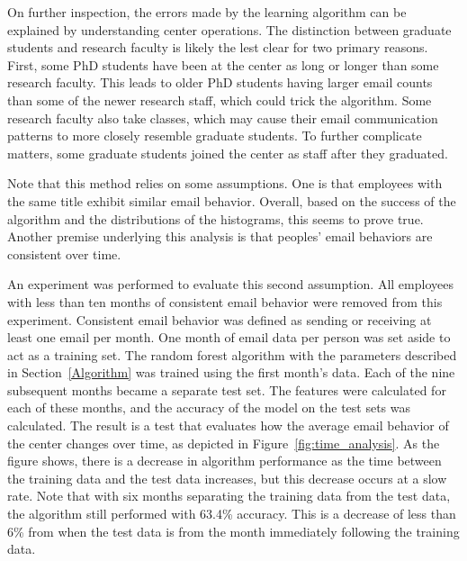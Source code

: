 \documentclass[12pt]{report}
\begin{document}
On further inspection, the errors made by the learning algorithm can be explained by understanding center operations.
The distinction between graduate students and research faculty is likely the lest clear for two primary reasons.
First, some PhD students have been at the center as long or longer than some research faculty.
This leads to older PhD students having larger email counts than some of the newer research staff, which could trick the algorithm.
Some research faculty also take classes, which may cause their email communication patterns to more closely resemble graduate students. 
To further complicate matters, some graduate students joined the center as staff after they graduated.


Note that this method relies on some assumptions.
One is that employees with the same title exhibit similar email behavior.
Overall, based on the success of the algorithm and the distributions of the histograms, this seems to prove true.
Another premise underlying this analysis is that peoples' email behaviors are consistent over time.

An experiment was performed to evaluate this second assumption.
All employees with less than ten months of consistent email behavior were removed from this experiment.
Consistent email behavior was defined as sending or receiving at least one email per month.
One month of email data per person was set aside to act as a training set.
The random forest algorithm with the parameters described in Section~\ref{Algorithm} was trained using the first month's data.
Each of the nine subsequent months became a separate test set.
The features were calculated for each of these months, and the accuracy of the model on the test sets was calculated.
The result is a test that evaluates how the average email behavior of the center changes over time, as depicted in Figure~\ref{fig:time_analysis}.
As the figure shows, there is a decrease in algorithm performance as the time between the training data and the test data increases, but this decrease occurs at a slow rate.
Note that with six months separating the training data from the test data, the algorithm still performed with 63.4\% accuracy.
This is a decrease of less than 6\% from when the test data is from the month immediately following the training data.
\end{document}
